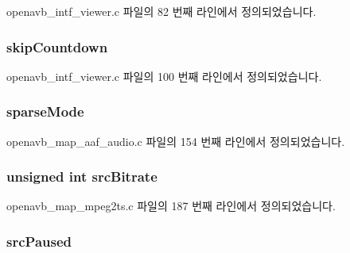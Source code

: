 openavb\+\_\+intf\+\_\+viewer.\+c 파일의 82 번째 라인에서 정의되었습니다.

\subsubsection[{\texorpdfstring{skip\+Countdown}{skipCountdown}}]{ skip\+Countdown}\hypertarget{structpvt__data__t_a1838f4f076e2590f57ec9955ef47b02b}{}\label{structpvt__data__t_a1838f4f076e2590f57ec9955ef47b02b}


openavb\+\_\+intf\+\_\+viewer.\+c 파일의 100 번째 라인에서 정의되었습니다.

\subsubsection[{\texorpdfstring{sparse\+Mode}{sparseMode}}]{ sparse\+Mode}\hypertarget{structpvt__data__t_aac6ba6c4ddae09e70335935026b3f183}{}\label{structpvt__data__t_aac6ba6c4ddae09e70335935026b3f183}


openavb\+\_\+map\+\_\+aaf\+\_\+audio.\+c 파일의 154 번째 라인에서 정의되었습니다.

\subsubsection[{\texorpdfstring{src\+Bitrate}{srcBitrate}}]{\setlength{\rightskip}{0pt plus 5cm}unsigned int src\+Bitrate}\hypertarget{structpvt__data__t_a3835bb662210f92d0c98a695e41f453f}{}\label{structpvt__data__t_a3835bb662210f92d0c98a695e41f453f}


openavb\+\_\+map\+\_\+mpeg2ts.\+c 파일의 187 번째 라인에서 정의되었습니다.

\subsubsection[{\texorpdfstring{src\+Paused}{srcPaused}}]{ src\+Paused}\hypertarget{structpvt__data__t_a51b21ed47332ea9205cdf1e7546a630d}{}\label{structpvt__data__t_a51b21ed47332ea9205cdf1e7546a630d}


